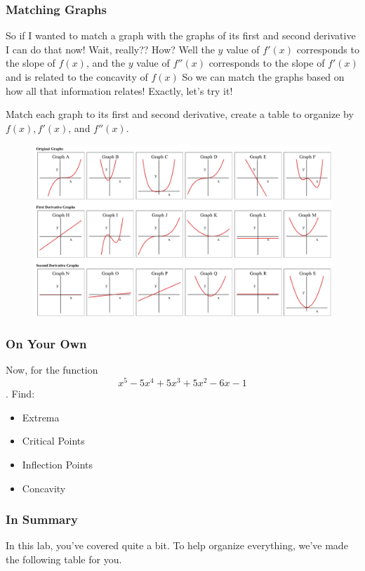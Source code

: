 \documentclass{ximera}
\begin{document}
\subsubsection{Matching Graphs}
\begin{dialogue}
So if I wanted to match a graph with the graphs of its first and second derivative I can do that now!
 Wait, really?? How?
 Well the $y$ value of $f'(x)$ corresponds to the slope of $f(x)$, and the $y$ value of $f''(x)$ corresponds to the slope of $f'(x)$ and is related to the concavity of $f(x)$
 So we can match the graphs based on how all that information relates!
 Exactly, let's try it!
\end{dialogue}
Match each graph to its first and second derivative, create a table to organize by $f(x),f'(x)$, and $f''(x)$.
\begin{figure}[h]
    \centering
    \includegraphics[width=150mm]{matching.jpg}
    \label{fig:matching}
\end{figure}

\subsubsection{On Your Own}
Now, for the function $$x^5-5x^4+5x^3+5x^2-6x-1$$. Find:
\begin{itemize}
\item{Extrema}
\item{Critical Points}
\item{Inflection Points}
\item{Concavity}
\end{itemize}


\subsubsection{In Summary}
In this lab, you've covered quite a bit. To help organize everything, we've made the following table for you.
\end{document}
